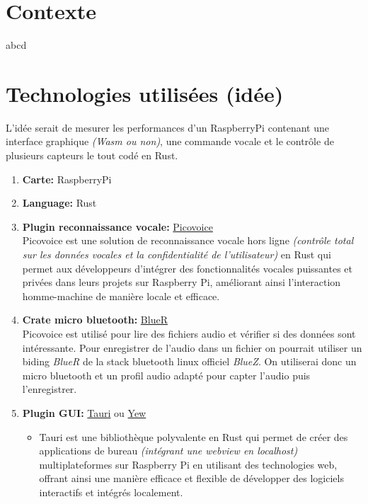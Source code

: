 \section{Contexte}


abcd

\section{Technologies utilisées (idée)}

L'idée serait de mesurer les performances d'un RaspberryPi contenant une interface graphique \textit{(Wasm ou non)}, une commande vocale et le contrôle de plusieurs capteurs le tout codé en Rust.
\vspace{.3cm}

\begin{enumerate}
    \item \textbf{Carte:} RaspberryPi 
    \item \textbf{Language:} Rust 
    \item \textbf{Plugin reconnaissance vocale:} \href{https://picovoice.ai/}{Picovoice} \\
            Picovoice est une solution de reconnaissance vocale hors ligne \textit{(contrôle total sur les données vocales et la confidentialité de l'utilisateur)} en Rust qui permet aux développeurs d'intégrer 
            des fonctionnalités vocales puissantes et privées dans leurs projets sur Raspberry Pi, améliorant ainsi l'interaction homme-machine de manière locale et efficace. 

    \item \textbf{Crate micro bluetooth:} \href{https://crates.io/crates/bluer}{BlueR} \\
            Picovoice est utilisé pour lire des fichiers audio et vérifier si des données sont intéressante. Pour enregistrer de l'audio dans un fichier
            on pourrait utiliser un biding \textit{BlueR} de la stack bluetooth linux officiel \textit{BlueZ}. On utiliserai donc un micro bluetooth et un profil
            audio adapté pour capter l'audio puis l'enregistrer.

    \item \textbf{Plugin GUI:} \href{https://tauri.app/}{Tauri} ou \href{https://yew.rs/}{Yew}

        \begin{itemize}
            \item Tauri est une bibliothèque polyvalente en Rust qui permet de créer des applications de bureau \textit{(intégrant une webview en localhost)}
            multiplateformes sur Raspberry Pi en utilisant des technologies web, offrant ainsi une manière efficace et flexible de développer des logiciels interactifs et intégrés localement.


\end{itemize}
\end{enumerate}
